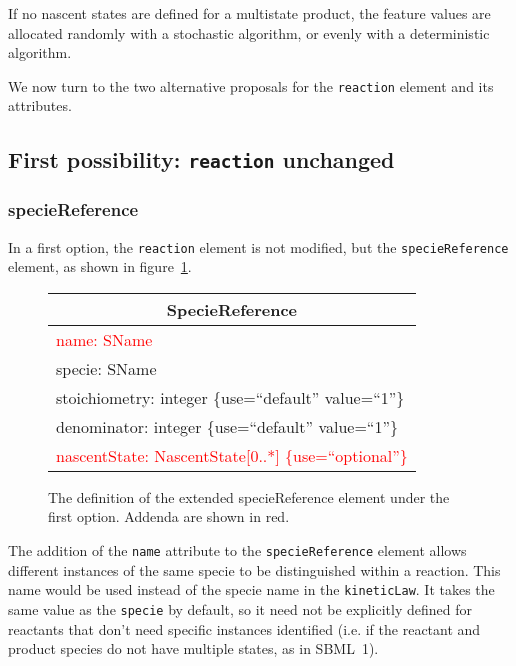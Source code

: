 \documentclass{cekarticle}
\begin{document}
If no nascent states are defined for a multistate product, the feature
values are allocated randomly with a stochastic algorithm, or evenly
with a deterministic algorithm.

We now turn to the two alternative proposals for the \texttt{reaction}
element and its attributes.

\subsection{First possibility: \texttt{reaction} unchanged}\label{sec:reactfirst}

\subsubsection{specieReference}

In a first option, the \texttt{reaction} element is not modified, but the
\texttt{specieReference} element, as shown in figure~\ref{fig:speciereference1}.

\begin{figure}[h]
  \vspace*{8pt}
  \centering
  \begin{tabular}{|l|}
    \hline
    \multicolumn{1}{|c|}{\rule[-3mm]{0mm}{8mm}{\textsf{SpecieReference}}}\\
    \hline
    \rule[0mm]{0mm}{5mm}{\textsf{\small \textcolor{red}{name: SName }}}\\
    \textsf{\small specie: SName }\\
    \textsf{\small stoichiometry: integer \{use=``default'' value=``1''\}  }\\
    \textsf{\small denominator: integer \{use=``default'' value=``1''\} }\\
    \rule[-3mm]{0mm}{5mm}{\textsf{\small \textcolor{red}{nascentState: NascentState[0..*] \{use=``optional''\}} }}\\
    \hline
  \end{tabular}
  \caption{The definition of the extended specieReference element under the first option. Addenda are shown in red.}
  \label{fig:speciereference1}
\end{figure}

The addition of the \texttt{name} attribute to the \texttt{specieReference} element
allows different instances of the same specie to be distinguished
within a reaction.  This name would be used instead of the specie name
in the \texttt{kineticLaw}.  It takes the same value as the \texttt{specie} by
default, so it need not be explicitly defined for reactants that don't
need specific instances identified (i.e. if the reactant and product species do not have
multiple states, as in SBML~1).
\end{document}
